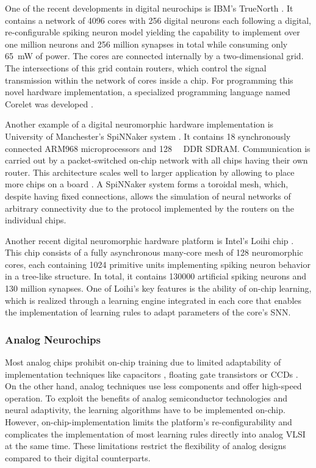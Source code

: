 One of the recent developments in digital neurochips is IBM's TrueNorth \cite{Akopyan2015}.
It contains a network of \num{4096} cores with \num{256} digital neurons each following a digital, re-configurable spiking neuron model \cite{Cassidy2013} yielding the capability to implement over one million neurons and \num{256} million synapses in total while consuming only \SI{65}{\milli\watt} of power.
The cores are connected internally by a two-dimensional grid.
The intersections of this grid contain routers, which control the signal transmission within the network of cores inside a chip.
For programming this novel hardware implementation, a specialized programming language named Corelet was developed \cite{Amir2013}.

Another example of a digital neuromorphic hardware implementation is University of Manchester's \ac{SpiNNaker} system \cite{Furber2014}.
It contains \num{18} synchronously connected ARM968 microprocessors and \SI{128}{\mega\byte} \ac{DDR} \ac{SDRAM}.
Communication is carried out by a packet-switched on-chip network with all chips having their own router.
This architecture scales well to larger application by allowing to place more chips on a board \cite{Painkras2013,Navaridas2009}.
A \ac{SpiNNaker} system forms a toroidal mesh, which, despite having fixed connections, allows the simulation of neural networks of arbitrary connectivity due to the protocol implemented by the routers on the individual chips.

Another recent digital neuromorphic hardware platform is Intel's Loihi chip \cite{Davies2018}.
This chip consists of a fully asynchronous many-core mesh of \num{128} neuromorphic cores, each containing \num{1024} primitive units implementing spiking neuron behavior in a tree-like structure.
In total, it contains \num{130000} artificial spiking neurons and \num{130} million synapses.
One of Loihi's key features is the ability of on-chip learning, which is realized through a learning engine integrated in each core that enables the implementation of learning rules to adapt parameters of the core's \ac{SNN}.

\subsubsection{Analog Neurochips}

Most analog chips prohibit on-chip training due to limited adaptability of implementation techniques like capacitors \cite{Schwartz1990}, floating gate transistors \cite{Holler1989} or \acp{CCD} \cite{Agranat1990}.
On the other hand, analog techniques use less components and offer high-speed operation.
To exploit the benefits of analog semiconductor technologies and neural adaptivity, the learning algorithms have to be implemented on-chip.
However, on-chip-implementation limits the platform's re-configurability and complicates the implementation of most learning rules directly into analog \ac{VLSI} at the same time.
These limitations restrict the flexibility of analog designs compared to their digital counterparts.

